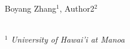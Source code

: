 \begin{center}
Boyang Zhang$^{1}$,
Author2$^{2}$

\bigskip\\
{\normalfont\itshape\footnotesize
$^1$ University of Hawai'i at Manoa\\
}
\end{center}
